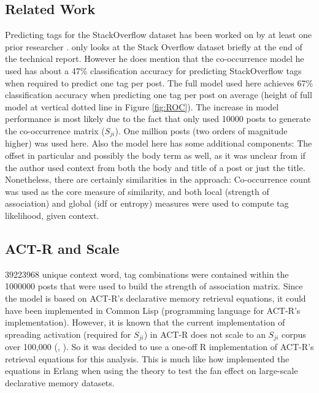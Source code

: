 \documentclass[10pt,letterpaper]{article}
\begin{document}
\subsection{Related Work}
Predicting tags for the StackOverflow dataset has been worked on by at least one prior researcher \cite{Kuo2011}.
 only looks at the Stack Overflow dataset briefly at the end of the technical report.
However he does mention that the co-occurrence model he used has about a 47\% classification accuracy for predicting StackOverflow tags when required to predict one tag per post.
The full model used here achieves 67\% classification accuracy when predicting one tag per post on average
(height of full model at vertical dotted line in Figure \ref{fig:ROC}).
The increase in model performance is most likely due to the fact that  only used \num{10000} posts to generate the co-occurrence matrix ($S_{ji}$).
One million posts (two orders of magnitude higher) was used here.
Also the model here has some additional components: The offset in particular and possibly the body term as well,
as it was unclear from  if the author used context from both the body and title of a post or just the title. 
Nonetheless, there are certainly similarities in the approach:
Co-occurrence count was used as the core measure of similarity, and both local (strength of association) and global (idf or entropy) measures were used to compute tag likelihood, given context.

\subsection{ACT-R and Scale}
\num{39223968} unique context word, tag combinations were contained within the \num{1000000} posts that were used to build the strength of association matrix.
Since the model is based on ACT-R's declarative memory retrieval equations, it could have been implemented in Common Lisp (programming language for ACT-R's implementation).
However, it is known that the current implementation of spreading activation (required for $S_{ji}$) in ACT-R does not scale to an $S_{ji}$ corpus over 100,000 (, ).
So it was decided to use a one-off R implementation of ACT-R's retrieval equations for this analysis.
This is much like how  implemented the equations in Erlang when using the theory to test the fan effect on large-scale declarative memory datasets.
\end{document}
